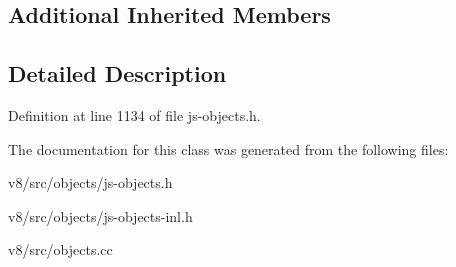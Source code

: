 \subsection*{Additional Inherited Members}


\subsection{Detailed Description}


Definition at line 1134 of file js-\/objects.\+h.



The documentation for this class was generated from the following files\+:\begin{DoxyCompactItemize}
\item 
v8/src/objects/js-\/objects.\+h\item 
v8/src/objects/js-\/objects-\/inl.\+h\item 
v8/src/objects.\+cc\end{DoxyCompactItemize}
